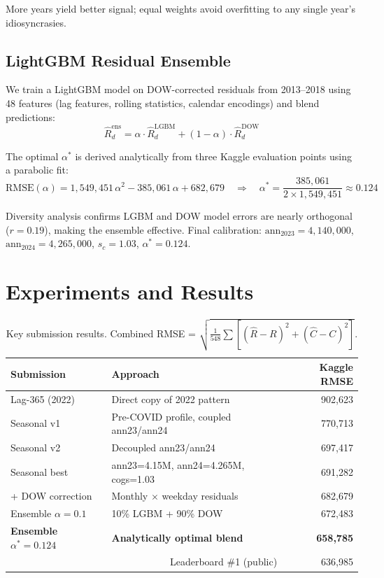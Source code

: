 \documentclass{article}
\begin{document}
More years yield better signal; equal weights avoid overfitting to any single year's idiosyncrasies.

\subsection{LightGBM Residual Ensemble}

We train a LightGBM model on DOW-corrected residuals from 2013--2018 using 48 features (lag features, rolling statistics, calendar encodings) and blend predictions:
\begin{equation}
\hat{R}^{\text{ens}}_d = \alpha \cdot \hat{R}^{\text{LGBM}}_d + (1-\alpha) \cdot \hat{R}^{\text{DOW}}_d
\end{equation}

The optimal $\alpha^*$ is derived analytically from three Kaggle evaluation points using a parabolic fit:
\begin{equation}
\text{RMSE}(\alpha) = 1{,}549{,}451\,\alpha^2 - 385{,}061\,\alpha + 682{,}679 \quad \Rightarrow \quad \alpha^* = \frac{385{,}061}{2 \times 1{,}549{,}451} \approx 0.124
\label{eq:parabola}
\end{equation}

Diversity analysis confirms LGBM and DOW model errors are nearly orthogonal ($r = 0.19$), making the ensemble effective.
Final calibration: $\text{ann}_{2023}=4{,}140{,}000$, $\text{ann}_{2024}=4{,}265{,}000$, $s_c=1.03$, $\alpha^*=0.124$.

\section{Experiments and Results}

\begin{table}[H]
\centering
\caption{Key submission results. Combined RMSE = $\sqrt{\frac{1}{548}\sum[(\hat{R}-R)^2 + (\hat{C}-C)^2]}$.}
\label{tab:results}
\small
\begin{tabular}{llr}
\toprule
Submission & Approach & Kaggle RMSE \\
\midrule
Lag-365 (2022) & Direct copy of 2022 pattern & 902{,}623 \\
Seasonal v1 & Pre-COVID profile, coupled ann23/ann24 & 770{,}713 \\
Seasonal v2 & Decoupled ann23/ann24 & 697{,}417 \\
Seasonal best & ann23=4.15M, ann24=4.265M, cogs=1.03 & 691{,}282 \\
+ DOW correction & Monthly $\times$ weekday residuals & 682{,}679 \\
Ensemble $\alpha=0.1$ & 10\% LGBM + 90\% DOW & 672{,}483 \\
\textbf{Ensemble $\alpha^*=0.124$} & \textbf{Analytically optimal blend} & \textbf{658{,}785} \\
\midrule
\multicolumn{2}{r}{Leaderboard \#1 (public)} & 636{,}985 \\
\bottomrule
\end{tabular}
\end{table}
\end{document}
